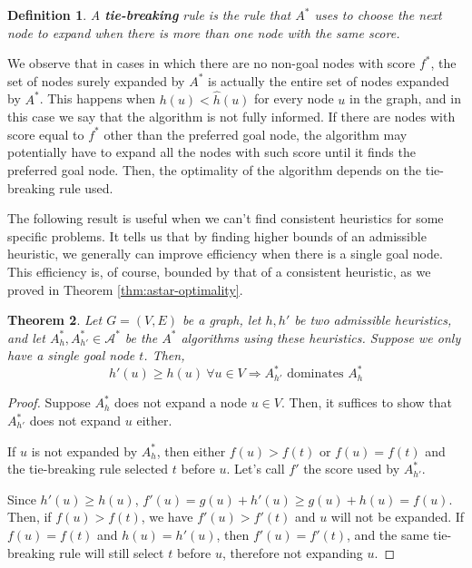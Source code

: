 \documentclass[12pt]{report}
\newtheorem{theorem}{Theorem}[chapter]
\newtheorem{definition}[theorem]{Definition}
\begin{document}
\begin{definition}
A \textbf{tie-breaking} rule is the rule that $A^*$ uses to choose the next node to expand when there is more than one node with the same score.
\end{definition}

We observe that in cases in which there are no non-goal nodes with score $f^*$, the set of nodes surely expanded by $A^*$ is actually the entire set of nodes expanded by $A^*$. This happens when $h(u) < \hat{h}(u)$ for every node $u$ in the graph, and in this case we say that the algorithm is not fully informed. If there are nodes with score equal to $f^*$ other than the preferred goal node, the algorithm may potentially have to expand all the nodes with such score until it finds the preferred goal node. Then, the optimality of the algorithm depends on the tie-breaking rule used.

The following result is useful when we can't find consistent heuristics for some specific problems. It tells us that by finding higher bounds of an admissible heuristic, we generally can improve efficiency when there is a single goal node. This efficiency is, of course, bounded by that of a consistent heuristic, as we proved in Theorem \ref{thm:astar-optimality}.

\begin{theorem}
\label{thm:dominating-heuristic}
Let $G = (V, E)$ be a graph, let $h, h'$ be two admissible heuristics, and let $A^*_h, A^*_{h'} \in \mathcal{A^*}$ be the $A^*$ algorithms using these heuristics. Suppose we only have a single goal node $t$. Then,
\[ h'(u) \geq h(u) \  \forall u \in V \Rightarrow A^*_{h'} \text{ dominates } A^*_h \]
\end{theorem}
\begin{proof}
Suppose $A^*_h$ does not expand a node $u \in V$. Then, it suffices to show that $A^*_{h'}$ does not expand $u$ either.

If $u$ is not expanded by $A^*_h$, then either $f(u) > f(t)$ or $f(u) = f(t)$ and the tie-breaking rule selected $t$ before $u$. Let's call $f'$ the score used by $A^*_{h'}$.

Since $h'(u) \geq h(u)$, $f'(u) = g(u) + h'(u) \geq g(u) + h(u) = f(u)$. Then, if $f(u) > f(t)$, we have $f'(u) > f'(t)$ and $u$ will not be expanded. If $f(u) = f(t)$ and $h(u) = h'(u)$, then $f'(u) = f'(t)$, and the same tie-breaking rule will still select $t$ before $u$, therefore not expanding $u$.
\end{proof}
\end{document}
